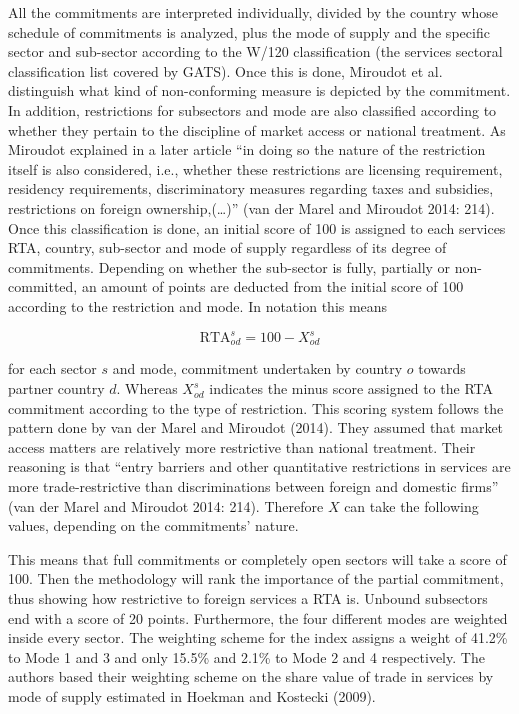 \documentclass{article}
\begin{document}
All the commitments are interpreted individually, divided by the country whose schedule of commitments is analyzed, plus the mode of supply and the specific sector and sub-sector according to the W/120 classification (the services sectoral classification list covered by GATS). Once this is done, Miroudot et al. distinguish what kind of non-conforming measure is depicted by the commitment. In addition, restrictions for subsectors and mode are also classified according to whether they pertain to the discipline of market access or national treatment. As Miroudot explained in a later article “in doing so the nature of the restriction itself is also considered, i.e., whether these restrictions are licensing requirement, residency requirements, discriminatory measures regarding taxes and subsidies, restrictions on foreign ownership,(…)” (van der Marel and Miroudot 2014: 214). Once this classification is done, an initial score of 100 is assigned to each services RTA, country, sub-sector and mode of supply regardless of its degree of commitments. Depending on whether the sub-sector is fully, partially or non-committed, an amount of points are deducted from the initial score of 100 according to the restriction and mode. In notation this means

\begin{equation}
    \text{RTA}^s_{od} = 100 - X^s_{od}
\end{equation}

for each sector $s$ and mode, commitment undertaken by country $o$ towards partner country $d$. Whereas $X^s_{od}$ indicates the minus score assigned to the RTA commitment according to the type of restriction. This scoring system follows the pattern done by van der Marel and Miroudot (2014). They assumed that market access matters are relatively more restrictive than national treatment. Their reasoning is that “entry barriers and other quantitative restrictions in services are more trade-restrictive than discriminations between foreign and domestic firms” (van der Marel and Miroudot 2014: 214). Therefore $X$ can take the following values, depending on the commitments’ nature.


This means that full commitments or completely open sectors will take a score of 100. Then the methodology will rank the importance of the partial commitment, thus showing how restrictive to foreign services a RTA is. Unbound subsectors end with a score of 20 points. Furthermore, the four different modes are weighted inside every sector. The weighting scheme for the index assigns a weight of 41.2\% to Mode 1 and 3 and only 15.5\% and 2.1\% to Mode 2 and 4 respectively. The authors based their weighting scheme on the share value of trade in services by mode of supply estimated in Hoekman and Kostecki (2009).
\end{document}
